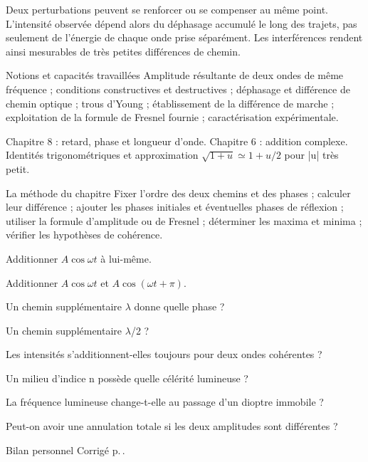 Deux perturbations peuvent se renforcer ou se compenser au même point. L’intensité observée dépend alors du déphasage accumulé le long des trajets, pas seulement de l’énergie de chaque onde prise séparément. Les interférences rendent ainsi mesurables de très petites différences de chemin.
\begin{loi}{Notions et capacités travaillées}
Amplitude résultante de deux ondes de même fréquence ; conditions constructives et destructives ; déphasage et différence de chemin optique ; trous d’Young ; établissement de la différence de marche ; exploitation de la formule de Fresnel fournie ; caractérisation expérimentale.
\end{loi}

Chapitre 8 : retard, phase et longueur d’onde. Chapitre 6 : addition complexe. Identités trigonométriques et approximation $\sqrt{1+u}\simeq1+u/2$ pour |u| très petit.

\begin{methode}{La méthode du chapitre}
Fixer l’ordre des deux chemins et des phases ; calculer leur différence ; ajouter les phases initiales et éventuelles phases de réflexion ; utiliser la formule d’amplitude ou de Fresnel ; déterminer les maxima et minima ; vérifier les hypothèses de cohérence.
\end{methode}


\begin{questions}
\item Additionner $A\cos\omega t$ à lui-même.
\item Additionner $A\cos\omega t$ et $A\cos(\omega t+\pi)$.
\item Un chemin supplémentaire \ensuremath{\lambda} donne quelle phase ?
\item Un chemin supplémentaire \ensuremath{\lambda}/2 ?
\item Les intensités s’additionnent-elles toujours pour deux ondes cohérentes ?
\item Un milieu d’indice n possède quelle célérité lumineuse ?
\item La fréquence lumineuse change-t-elle au passage d’un dioptre immobile ?
\item Peut-on avoir une annulation totale si les deux amplitudes sont différentes ?
\end{questions}
\begin{docu}{Bilan personnel}
Corrigé p.\,\pageref{ch09-corr-diag}.
\end{docu}


